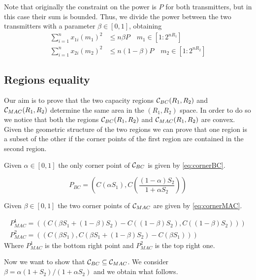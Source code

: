 Note that originally the constraint on the power is $P$ for both transmitters, but in this case their sum is bounded. Thus, we divide the power between the two transmitters with a parameter $\beta\in [0,1]$, obtaining
%
\begin{equation}
	\begin{split}
		\sum_{i=1}^n x_{1i}(m_1)^2 &\leq n \beta P \quad m_1 \in [1:2^{nR_1}]\\
		\sum_{i=1}^n x_{2i}(m_2)^2 &\leq n (1- \beta ) P \quad m_2 \in [1:2^{nR_2}]
	\end{split}
	\label{eq:powcon3}
\end{equation}

\subsection{Regions equality}

Our aim is to prove that the two capacity regions $\mathcal{C}_{BC}(R_1, R_2)$ and $\mathcal{C}_{MAC}(R_1, R_2)$ determine the same area in the $(R_1, R_2)$ space. In order to do so we notice that both the regions $\mathcal{C}_{BC}(R_1, R_2)$ and $\mathcal{C}_{MAC}(R_1, R_2)$ are convex. Given the geometric structure of the two regions we can prove that one region is a subset of the other if the corner points of the first region are contained in the second region.

Given $\alpha \in [0,1]$ the only corner point of $\mathcal{C}_{BC}$ is given by \eqref{eq:cornerBC}.

\begin{equation}
	P_{BC} = \left( C(\alpha S_1) , C \left( \frac{(1-\alpha)S_2}{1+\alpha S_2} \right) \right)
	\label{eq:cornerBC}
\end{equation}

Given $\beta \in [0,1]$ the two corner points of $\mathcal{C}_{MAC}$ are given by \eqref{eq:cornerMAC}.

\begin{equation}
	\begin{gathered}
		P_{MAC}^1 = (\left( C (\beta S_1 + (1-\beta)S_2) - C((1-\beta)S_2) , C \left( (1-\beta)S_2 \right) \right)) \\ P_{MAC}^2 = (\left(C \left(\beta S_1 \right), C (\beta S_1 + (1-\beta)S_2) - C(\beta S_1) \right))
	\end{gathered}
	\label{eq:cornerMAC}
\end{equation}
%
Where $P_{MAC}^1$ is the bottom right point and $P_{MAC}^2$ is the top right one.

Now we want to show that $\mathcal{C}_{BC} \subseteq \mathcal{C}_{MAC}$. We consider $\beta = \alpha(1+S_2)/(1+\alpha S_2)$ and we obtain what follows.

